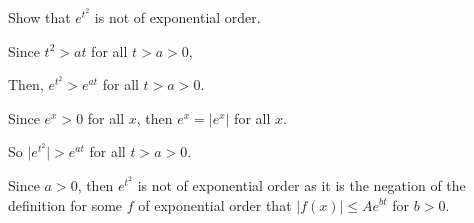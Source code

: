 \documentclass[../hw7]{subfiles}
\begin{document}
Show that $e^{t^2}$ is not of exponential order.

Since $t^2>at$ for all $t>a>0$,

Then, $e^{t^2}>e^{at}$ for all $t>a>0$.

Since $e^x>0$ for all $x$, then $e^x=|e^x|$ for all $x$.

So $\Big|e^{t^2}\Big|>e^{at}$ for all $t>a>0$.

Since $a>0$, then $e^{t^2}$ is not of exponential order as it is the negation of the definition for some $f$ of exponential order that $|f(x)|\leq Ae^{bt}$ for $b>0$.
\end{document}
